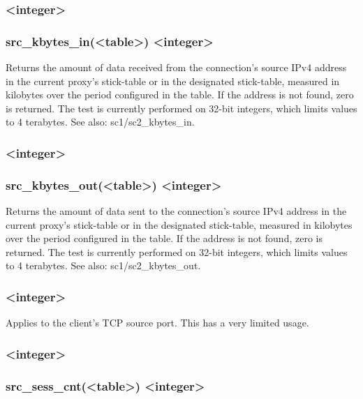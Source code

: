 \subsubsection[src\_kbytes\_in]{ <integer>}
\subsubsection*{src\_kbytes\_in(<table>) <integer>}

Returns the amount of data received from the connection's source IPv4 address
in the current proxy's stick-table or in the designated stick-table, measured
in kilobytes over the period configured in the table. If the address is not
found, zero is returned. The test is currently performed on 32-bit integers,
which limits values to 4 terabytes. See also: sc1/sc2\_kbytes\_in.

\subsubsection[src\_kbytes\_out]{ <integer>}
\subsubsection*{src\_kbytes\_out(<table>) <integer>}

Returns the amount of data sent to the connection's source IPv4 address in
the current proxy's stick-table or in the designated stick-table, measured
in kilobytes over the period configured in the table. If the address is not
found, zero is returned. The test is currently performed on 32-bit integers,
which limits values to 4 terabytes. See also: sc1/sc2\_kbytes\_out.

\subsubsection[src\_port]{ <integer>}

  Applies to the client's TCP source port. This has a very limited usage.

\subsubsection[src\_sess\_cnt]{ <integer>}
\subsubsection*{src\_sess\_cnt(<table>) <integer>}

